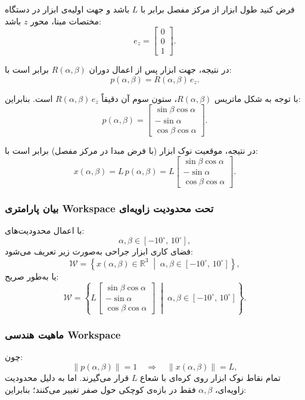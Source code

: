 \documentclass{article}
\begin{document}
فرض کنید طول ابزار از مرکز مفصل برابر با \(L\) باشد و جهت اولیه‌ی ابزار در دستگاه مختصات مبنا، محور \(z\) باشد:
\[
e_z =
\begin{bmatrix}
	0\\
	0\\
	1
\end{bmatrix}.
\]

در نتیجه، جهت ابزار پس از اعمال دوران \(R(\alpha,\beta)\) برابر است با:
\[
p(\alpha,\beta) = R(\alpha,\beta)\,e_z.
\]

با توجه به شکل ماتریس \(R(\alpha,\beta)\)، ستون سوم آن دقیقاً \(R(\alpha,\beta)\,e_z\) است. بنابراین:
\[
p(\alpha,\beta) =
\begin{bmatrix}
	\sin\beta\cos\alpha\\[4pt]
	-\sin\alpha\\[4pt]
	\cos\beta\cos\alpha
\end{bmatrix}.
\]

در نتیجه، موقعیت نوک ابزار (با فرض مبدا در مرکز مفصل) برابر است با:
\[
x(\alpha,\beta) = L\,p(\alpha,\beta) =
L\begin{bmatrix}
	\sin\beta\cos\alpha\\[4pt]
	-\sin\alpha\\[4pt]
	\cos\beta\cos\alpha
\end{bmatrix}.
\]

\subsubsection{بیان پارامتری Workspace تحت محدودیت زاویه‌ای}

با اعمال محدودیت‌های:
\[
\alpha,\beta \in [-10^\circ,\,10^\circ],
\]
فضای کاری ابزار جراحی به‌صورت زیر تعریف می‌شود:
\[
\mathcal{W} =
\left\{
x(\alpha,\beta) \in \mathbb{R}^3\;\middle|\;
\alpha,\beta \in [-10^\circ,\,10^\circ]
\right\},
\]
یا به‌طور صریح:
\[
\mathcal{W} =
\left\{
L
\begin{bmatrix}
	\sin\beta\cos\alpha\\[4pt]
	-\sin\alpha\\[4pt]
	\cos\beta\cos\alpha
\end{bmatrix}
\;\middle|\;
\alpha,\beta \in [-10^\circ,\,10^\circ]
\right\}.
\]

\subsubsection{ماهیت هندسی Workspace}

چون:
\[
\|p(\alpha,\beta)\| = 1
\quad\Longrightarrow\quad
\|x(\alpha,\beta)\| = L,
\]
تمام نقاط نوک ابزار روی کره‌ای با شعاع \(L\) قرار می‌گیرند. اما به دلیل محدودیت زاویه‌ای، \(\alpha,\beta\) فقط در بازه‌ی کوچکی حول صفر تغییر می‌کنند؛ بنابراین:
\end{document}

